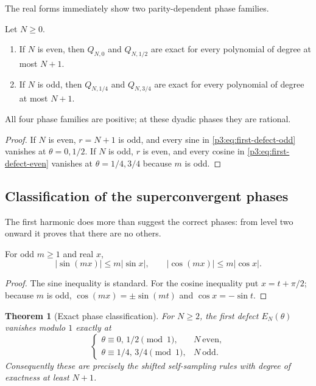 \documentclass[11pt,oneside]{article}
\numberwithin{equation}{section}
\newtheorem{theorem}{Theorem}[section]
\theoremstyle{definition}
\theoremstyle{remark}
\newcommand{\abs}[1]{\left|#1\right|}
\begin{document}
The real forms immediately show two parity-dependent phase families.

\begin{corollary}
\label{p3:cor:forced-superconvergence}
Let $N\ge0$.
\begin{enumerate}
\item If $N$ is even, then $Q_{N,0}$ and $Q_{N,1/2}$ are exact for every polynomial of degree at most $N+1$.
\item If $N$ is odd, then $Q_{N,1/4}$ and $Q_{N,3/4}$ are exact for every polynomial of degree at most $N+1$.
\end{enumerate}
All four phase families are positive; at these dyadic phases they are rational.
\end{corollary}

\begin{proof}
If $N$ is even, $r=N+1$ is odd, and every sine in \eqref{p3:eq:first-defect-odd} vanishes at $\theta=0,1/2$.  If $N$ is odd, $r$ is even, and every cosine in \eqref{p3:eq:first-defect-even} vanishes at $\theta=1/4,3/4$ because $m$ is odd.
\end{proof}

\subsection{Classification of the superconvergent phases}

The first harmonic does more than suggest the correct phases: from level two onward it proves that there are no others.

\begin{lemma}
\label{p3:lem:odd-trig-factor}
For odd $m\ge1$ and real $x$,
\begin{equation}
 \abs{\sin(mx)}\le m\abs{\sin x},
 \qquad
 \abs{\cos(mx)}\le m\abs{\cos x}.
 \label{p3:eq:odd-trig-factor}
\end{equation}
\end{lemma}

\begin{proof}
The sine inequality is standard.  For the cosine inequality put $x=t+\pi/2$; because $m$ is odd, $\cos(mx)=\pm\sin(mt)$ and $\cos x=-\sin t$.
\end{proof}

\begin{theorem}[Exact phase classification]
\label{p3:thm:phase-classification}
For $N\ge2$, the first defect $E_N(\theta)$ vanishes modulo $1$ exactly at
\begin{equation}
 \begin{cases}
 \theta\equiv0,\,1/2\pmod1,&N\ \text{even},\\
 \theta\equiv1/4,\,3/4\pmod1,&N\ \text{odd}.
 \end{cases}
 \label{p3:eq:phase-classification}
\end{equation}
Consequently these are precisely the shifted self-sampling rules with degree of exactness at least $N+1$.
\end{theorem}
\end{document}
